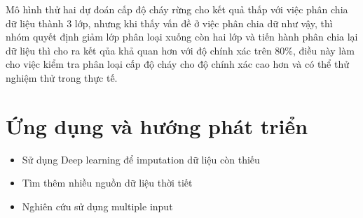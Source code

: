 \documentclass{article}
\begin{document}
Mô hình thử hai dự đoán cấp độ cháy rừng cho kết quả thấp với việc phân chia dữ liệu thành 3 lớp, nhưng khi thấy vấn đề ở việc phân chia dữ như vậy, thì nhóm quyết định giảm lớp phân loại xuống còn hai lớp và tiến hành phân chia lại dữ liệu thì cho ra kết qủa khả quan hơn với độ chính xác trên 80\%, điều này làm cho việc kiểm tra phân loại cấp độ cháy cho độ chính xác cao hơn và có thể thử nghiệm thử trong thực tế.




\section{Ứng dụng và hướng phát triển}

\begin{itemize}
	\item Sử dụng Deep learning để imputation dữ liệu còn thiếu
	\item Tìm thêm nhiều nguồn dữ liệu thời tiết
	\item Nghiên cứu sử dụng multiple input
\end{itemize}






\end{document}
